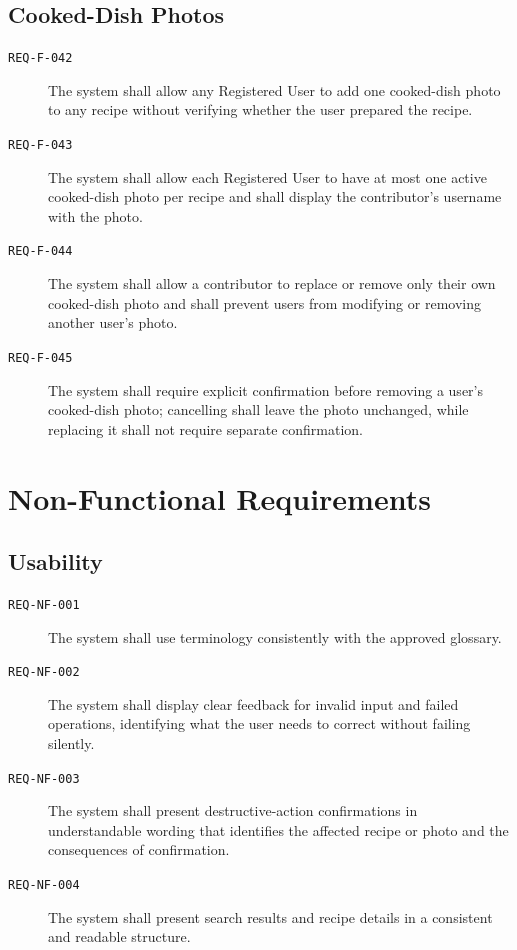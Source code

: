 \documentclass[12pt]{article}
\begin{document}
\subsection{Cooked-Dish Photos}
\begin{description}
    \item[\texttt{REQ-F-042}] The system shall allow any Registered User to add one cooked-dish photo to any recipe without verifying whether the user prepared the recipe.
    \item[\texttt{REQ-F-043}] The system shall allow each Registered User to have at most one active cooked-dish photo per recipe and shall display the contributor's username with the photo.
    \item[\texttt{REQ-F-044}] The system shall allow a contributor to replace or remove only their own cooked-dish photo and shall prevent users from modifying or removing another user's photo.
    \item[\texttt{REQ-F-045}] The system shall require explicit confirmation before removing a user's cooked-dish photo; cancelling shall leave the photo unchanged, while replacing it shall not require separate confirmation.
\end{description}

\section{Non-Functional Requirements}

\subsection{Usability}
\begin{description}
    \item[\texttt{REQ-NF-001}] The system shall use terminology consistently with the approved glossary.
    \item[\texttt{REQ-NF-002}] The system shall display clear feedback for invalid input and failed operations, identifying what the user needs to correct without failing silently.
    \item[\texttt{REQ-NF-003}] The system shall present destructive-action confirmations in understandable wording that identifies the affected recipe or photo and the consequences of confirmation.
    \item[\texttt{REQ-NF-004}] The system shall present search results and recipe details in a consistent and readable structure.
\end{description}
\end{document}
